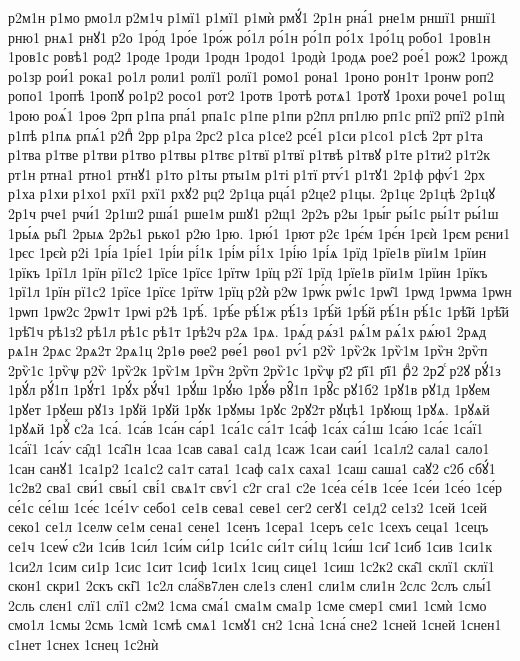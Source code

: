 {р2м1н
р1мо
рмо1л
р2м1ч
р1мї1
р1мї1
р1мѝ
рмꙋ́1
2р1н
рна́1
рне1м
рншї1
рншї1
рню1
рнѧ1
рнꙋ1
р2о
1ро́д
1ро́е
1ро́ж
ро́1л
ро́1н
ро́1п
ро́1х
1ро́1ц
робо1
1ров1н
1ров1с
ровѣ1
род2
1роде
1роди
1родн
1родо1
1родѝ
1родѧ
рое2
рое́1
рож2
1рожд
ро1зр
рои́1
рока1
ро1л
роли1
ролї1
ролї1
ромо1
рона1
1роно
рон1т
1ронѡ
роп2
ропо1
1ропѣ
1ропꙋ
ро1р2
росо1
рот2
1ротв
1ротѣ
ротѧ1
1ротꙋ
1рохи
роче1
ро1щ
1рою
роѧ́1
1роѳ
2рп
р1па
рпа́1
рпа1с
р1пе
р1пи
р2пл
рп1лю
рп1с
рпї2
рпї2
р1пѝ
р1пѣ
р1пѧ
рпѧ́1
р2пⷣ
2рр
р1ра
2рс2
р1са
р1се2
рсе́1
р1си
р1со1
р1сѣ
2рт
р1та
р1тва
р1тве
р1тви
р1тво
р1твы
р1твє
р1твї
р1твї
р1твѣ
р1твꙋ
р1те
р1ти2
р1т2к
рт1н
ртна1
ртно1
ртнꙋ1
р1то
р1ты
рты1м
р1ті
р1тї
ртѵ́1
р1тꙋ1
2р1ф
рфѵ́1
2рх
р1ха
р1хи
р1хо1
рхї1
рхї1
рхꙋ2
рц2
2р1ца
рца́1
р2це2
р1цы.
2р1цє
2р1цѣ
2р1цꙋ
2р1ч
рче1
рчи́1
2р1ш2
рша́1
рше1м
ршꙋ1
р2щ1
2р2ъ
р2ы
1ры́г
ры́1с
ры́1т
ры́1ш
1ры́ѧ
ры̑1
2рыѧ
2р2ь1
рько1
р2ю
1рю.
1рю́1
1рют
р2є
1рє́м
1рє́н
1рєѝ
1рєм
рєни1
1рєс
1рєѝ
р2і
1рі́а
1рі́е1
1рі́и
рі́1к
1рі́м
рі́1х
1рі́ю
1рі́ѧ
1рїд
1рїе1в
рїи1м
1рїин
1рїкъ
1рї1л
1рїн
рї1с2
1рїсе
1рїсє
1рїтѡ
1рїц
р2ї
1рїд
1рїе1в
рїи1м
1рїин
1рїкъ
1рї1л
1рїн
рї1с2
1рїсе
1рїсє
1рїтѡ
1рїц
р2ѝ
р2ѡ
1рѡ́к
рѡ́1с
1рѡ̑1
1рѡд
1рѡма
1рѡн
1рѡп
1рѡ2с
2рѡ1т
1рѡі
р2ѣ
1рѣ́.
1рѣ́е
рѣ́1ж
рѣ́1з
1рѣ́й
1рѣ́й
рѣ́1н
рѣ́1с
1рѣ̑й
1рѣ̑й
1рѣ̑1ч
рѣ1з2
рѣ1л
рѣ1с
рѣ1т
1рѣ2ч
р2ѧ
1рѧ.
1рѧ́д
рѧ́з1
рѧ́1м
рѧ́1х
рѧ́ю1
2рѧд
рѧ1н
2рѧс
2рѧ2т
2рѧ1ц
2р1ѳ
рѳе2
рѳе́1
рѳо1
рѵ́1
р2ѷ
1рѷ2к
1рѷ1м
1рѷн
2рѷп
2рѷ1с
1рѷѱ
р2ѷ
1рѷ2к
1рѷ1м
1рѷн
2рѷп
2рѷ1с
1рѷѱ
р҃2
р҃ї1
р҃ї1
рⷣ2
2р2ⷭ
р2ꙋ
рꙋ́1з
1рꙋ́л
рꙋ́1п
1рꙋ́т1
1рꙋ́х
рꙋ́ч1
1рꙋ́ш
1рꙋ́ю
1рꙋ́ѳ
рꙋ̑1п
1рꙋ̑с
рꙋ1б2
1рꙋ1в
рꙋ1д
1рꙋем
1рꙋет
1рꙋеш
рꙋ1з
1рꙋй
1рꙋй
1рꙋк
1рꙋмы
1рꙋс
2рꙋ2т
рꙋцѣ1
1рꙋющ
1рꙋѧ.
1рꙋѧй
1рꙋѧй
1рꙋⷯ
с2а
1са́.
1са́в
1са́н
са́р1
1са́1с
са́1т
1са́ф
1са́х
са́1ш
1са́ю
1са́є
1са́ї1
1са́ї1
1са́ѵ
са̑д1
1са̑1н
1саа
1сав
сава1
са1д
1саж
1саи
саи́1
1са1л2
сала1
сало1
1сан
санꙋ1
1са1р2
1са1с2
са1т
сата1
1саф
са1х
саха1
1саш
саша1
саꙋ2
с2б
сбꙋ́1
1с2в2
сва1
сви́1
свы́1
сві́1
свѧ1т
свѵ́1
с2г
сга1
с2е
1се́а
се́1в
1се́е
1се́и
1се́о
1се́р
се́1с
се́1ш
1се́є
1се́1ѵ
себо1
се1в
сева1
севе1
сег2
сегꙋ1
се1д2
се1з2
1сей
1сей
секо1
се1л
1селѡ
се1м
сена1
сене1
1сенъ
1сера1
1серъ
се1с
1сехъ
сеца1
1сецъ
се1ч
1сеѡ́
с2и
1си́в
1си́л
1си́м
си́1р
1си́1с
си́1т
си́1ц
1си́ш
1си̑
1сиб
1сив
1си1к
1си2л
1сим
си1р
1сис
1сит
1сиф
1си1х
1сиц
сице1
1сиш
1с2к2
ска̑1
склї1
склї1
скон1
скри1
2скъ
скі̑1
1с2л
сла́8в7лен
сле1з
слен1
сли1м
сли1н
2слс
2слъ
слы́1
2сль
слєн1
слї1
слї1
с2м2
1сма
сма́1
сма1м
сма1р
1сме
смер1
сми1
1смѝ
1смо
смо1л
1смы
2смь
1смѝ
1смѣ
смѧ1
1смꙋ1
сн2
1сна̀
1сна́
сне2
1сней
1сней
1снен1
с1нет
1снех
1снец
1с2нѝ
}
